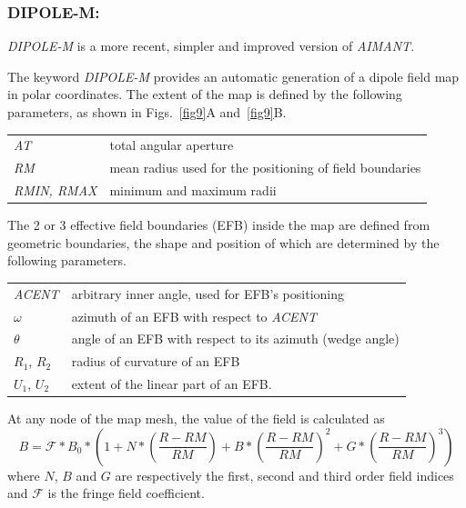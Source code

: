 \newpage

\subsubsection*{DIPOLE-M: \DIPOLEMTitl} \label{DIPOLE-M} 
\medskip

\noindent\textsl{DIPOLE-M} is a more recent, simpler and improved version of 
\textsl{AIMANT}.  
\bigskip

\noindent The keyword \textsl{DIPOLE-M} provides an automatic generation of a dipole 
field map in polar coordinates. The extent of the map is defined by the 
following parameters, as shown in Figs.~\ref{fig9}A and~\ref{fig9}B.
\bigskip

 \begin{tabular}{>{\sl}l!{:}l}
	 AT &  total angular aperture\\
	 RM & mean radius used for the positioning of field boundaries\\
	 RMIN, RMAX
	    &  minimum and maximum radii 
 \end{tabular}
\bigskip
 
\noindent The 2 or 3 effective field boundaries (EFB) inside the map are
defined from geometric boundaries, the shape and position of which are determined by the 
following parameters. 
\bigskip

\begin{tabular}{l!{:}l}
	 \textsl{ACENT} 
	    & arbitrary inner angle, used for EFB's positioning  \\
	$\omega$ &  azimuth of an EFB with respect to  \textsl{ACENT}\\
	$\theta$ & angle of an EFB with respect to its azimuth (wedge angle)\\ 
	$R_1$, $R_2$  &  radius of curvature of an EFB\\
	$U_1$, $U_2$  &  extent of the linear part of an EFB. 
\end{tabular}
\bigskip


\noindent At  any node  of the map mesh, the value of the field is calculated as 
 \begin{equation}
	 B =  \mathcal{F} \ast  B_0 \ast  
	      \left(1+N \ast  
	           \left( \frac{R-RM }{ RM}\right) 
	           + B \ast  \left(\frac{R-RM }{ RM} \right)^2 
	           + G \ast  \left(\frac{R-RM }{ RM} \right)^3 
	      \right) 
 	\label{eq3-3-1}
 \end{equation}
%
 where  $ N$, $B $ and $ G $ are  respectively  the first, second and
third order field indices and $ \mathcal{F}$ is the fringe field coefficient. 



